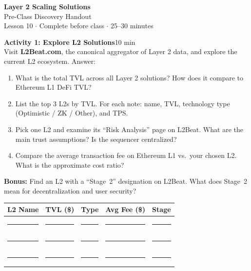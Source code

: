 \documentclass[11pt,a4paper]{article}
\newcommand{\activitybox}[3]{%
  \noindent\colorbox{mllavender4}{\parbox{\dimexpr\linewidth-2\fboxsep}{%
    \textbf{\color{mlpurple}#1}\hfill\textcolor{mlgray}{\small #2}\\[2pt]#3%
  }}\par\vspace{4pt}%
}
\newcommand{\fillcell}{\rule{2.2cm}{0.3pt}}
\begin{document}
\begin{center}
{\LARGE\color{mlpurple}\textbf{Layer 2 Scaling Solutions}}\\[4pt]
{\large\color{mlblue}Pre-Class Discovery Handout}\\[2pt]
{\small\color{mlgray}Lesson 10 $\cdot$ Complete before class $\cdot$ 25--30 minutes}
\end{center}
\vspace{4pt}

\activitybox{Activity 1: Explore L2 Solutions}{10 min}{%
Visit \textbf{L2Beat.com}, the canonical aggregator of Layer 2 data, and explore the current L2 ecosystem. Answer:
\begin{enumerate}
\item What is the total TVL across all Layer 2 solutions? How does it compare to Ethereum L1 DeFi TVL?
\item List the top 3 L2s by TVL. For each note: name, TVL, technology type (Optimistic / ZK / Other), and TPS.
\item Pick one L2 and examine its ``Risk Analysis'' page on L2Beat. What are the main trust assumptions? Is the sequencer centralized?
\item Compare the average transaction fee on Ethereum L1 vs.\ your chosen L2. What is the approximate cost ratio?
\end{enumerate}
\textbf{Bonus:} Find an L2 with a ``Stage~2'' designation on L2Beat. What does Stage~2 mean for decentralization and user security?
\vspace{4pt}
{\footnotesize\renewcommand{\arraystretch}{1.35}%
\setlength{\tabcolsep}{5pt}%
\begin{tabular}{@{}lllll@{}}
\toprule
\textbf{L2 Name} & \textbf{TVL (\$)} & \textbf{Type} & \textbf{Avg Fee (\$)} & \textbf{Stage} \\
\midrule
\fillcell & \fillcell & \fillcell & \fillcell & \fillcell \\
\fillcell & \fillcell & \fillcell & \fillcell & \fillcell \\
\fillcell & \fillcell & \fillcell & \fillcell & \fillcell \\
\bottomrule
\end{tabular}}
\vspace{2pt}
}

\vspace{2pt}
\end{document}
